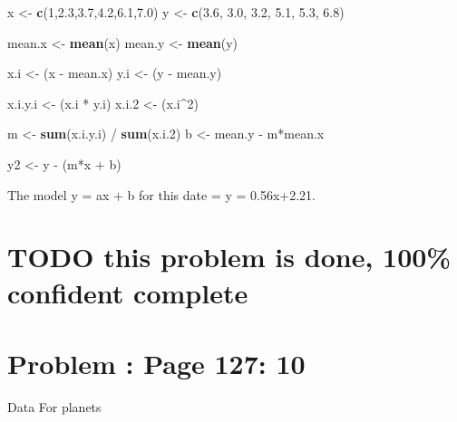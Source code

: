 \documentclass[]{article}
\newenvironment{Shaded}{\begin{snugshade}}{\end{snugshade}}
\newcommand{\KeywordTok}[1]{\textcolor[rgb]{0.13,0.29,0.53}{\textbf{{#1}}}}
\newcommand{\DecValTok}[1]{\textcolor[rgb]{0.00,0.00,0.81}{{#1}}}
\newcommand{\FloatTok}[1]{\textcolor[rgb]{0.00,0.00,0.81}{{#1}}}
\newcommand{\StringTok}[1]{\textcolor[rgb]{0.31,0.60,0.02}{{#1}}}
\newcommand{\NormalTok}[1]{{#1}}
\begin{document}
\begin{Shaded}
\begin{Highlighting}[]
\NormalTok{x <-}\StringTok{ }\KeywordTok{c}\NormalTok{(}\DecValTok{1}\NormalTok{,}\FloatTok{2.3}\NormalTok{,}\FloatTok{3.7}\NormalTok{,}\FloatTok{4.2}\NormalTok{,}\FloatTok{6.1}\NormalTok{,}\FloatTok{7.0}\NormalTok{)}
\NormalTok{y <-}\StringTok{ }\KeywordTok{c}\NormalTok{(}\FloatTok{3.6}\NormalTok{, }\FloatTok{3.0}\NormalTok{, }\FloatTok{3.2}\NormalTok{, }\FloatTok{5.1}\NormalTok{, }\FloatTok{5.3}\NormalTok{, }\FloatTok{6.8}\NormalTok{)}

\NormalTok{mean.x <-}\StringTok{ }\KeywordTok{mean}\NormalTok{(x)}
\NormalTok{mean.y <-}\StringTok{ }\KeywordTok{mean}\NormalTok{(y)}

\NormalTok{x.i <-}\StringTok{ }\NormalTok{(x -}\StringTok{ }\NormalTok{mean.x)}
\NormalTok{y.i <-}\StringTok{ }\NormalTok{(y -}\StringTok{ }\NormalTok{mean.y)}


\NormalTok{x.i.y.i <-}\StringTok{ }\NormalTok{(x.i *}\StringTok{ }\NormalTok{y.i)}
\NormalTok{x.i}\FloatTok{.2}   \NormalTok{<-}\StringTok{ }\NormalTok{(x.i^}\DecValTok{2}\NormalTok{)}

\NormalTok{m <-}\StringTok{ }\KeywordTok{sum}\NormalTok{(x.i.y.i) /}\StringTok{ }\KeywordTok{sum}\NormalTok{(x.i}\FloatTok{.2}\NormalTok{)}
\NormalTok{b <-}\StringTok{ }\NormalTok{mean.y -}\StringTok{ }\NormalTok{m*mean.x}

\NormalTok{y2 <-}\StringTok{ }\NormalTok{y -}\StringTok{ }\NormalTok{(m*x +}\StringTok{ }\NormalTok{b)}
\end{Highlighting}
\end{Shaded}

The model y = ax + b for this date = y = 0.56x+2.21.

\section{TODO this problem is done, 100\% confident
complete}\label{todo-this-problem-is-done-100-confident-complete}

\section{Problem : Page 127: 10}\label{problem-page-127-10}

Data For planets
\end{document}
